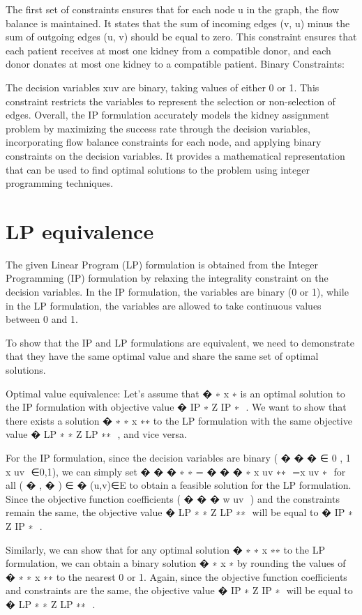 \documentclass{ULBreport}
\begin{document}
The first set of constraints ensures that for each node u in the graph, the flow balance is maintained. It states that the sum of incoming edges (v, u) minus the sum of outgoing edges (u, v) should be equal to zero. This constraint ensures that each patient receives at most one kidney from a compatible donor, and each donor donates at most one kidney to a compatible patient.
Binary Constraints:

The decision variables xuv are binary, taking values of either 0 or 1. This constraint restricts the variables to represent the selection or non-selection of edges.
Overall, the IP formulation accurately models the kidney assignment problem by maximizing the success rate through the decision variables, incorporating flow balance constraints for each node, and applying binary constraints on the decision variables. It provides a mathematical representation that can be used to find optimal solutions to the problem using integer programming techniques.


\section{LP equivalence}
The given Linear Program (LP) formulation is obtained from the Integer Programming (IP) formulation by relaxing the integrality constraint on the decision variables. In the IP formulation, the variables are binary (0 or 1), while in the LP formulation, the variables are allowed to take continuous values between 0 and 1.

To show that the IP and LP formulations are equivalent, we need to demonstrate that they have the same optimal value and share the same set of optimal solutions.

Optimal value equivalence:
Let's assume that 
�
∗
x 
∗
  is an optimal solution to the IP formulation with objective value 
�
IP
∗
Z 
IP
∗
​
 . We want to show that there exists a solution 
�
∗
∗
x 
∗∗
  to the LP formulation with the same objective value 
�
LP
∗
∗
Z 
LP
∗∗
​
 , and vice versa.

For the IP formulation, since the decision variables are binary (
�
�
�
∈
{
0
,
1
}
x 
uv
​
 ∈{0,1}), we can simply set 
�
�
�
∗
∗
=
�
�
�
∗
x 
uv
∗∗
​
 =x 
uv
∗
​
  for all 
(
�
,
�
)
∈
�
(u,v)∈E to obtain a feasible solution for the LP formulation. Since the objective function coefficients (
�
�
�
w 
uv
​
 ) and the constraints remain the same, the objective value 
�
LP
∗
∗
Z 
LP
∗∗
​
  will be equal to 
�
IP
∗
Z 
IP
∗
​
 .

Similarly, we can show that for any optimal solution 
�
∗
∗
x 
∗∗
  to the LP formulation, we can obtain a binary solution 
�
∗
x 
∗
  by rounding the values of 
�
∗
∗
x 
∗∗
  to the nearest 0 or 1. Again, since the objective function coefficients and constraints are the same, the objective value 
�
IP
∗
Z 
IP
∗
​
  will be equal to 
�
LP
∗
∗
Z 
LP
∗∗
​
 .
\end{document}
